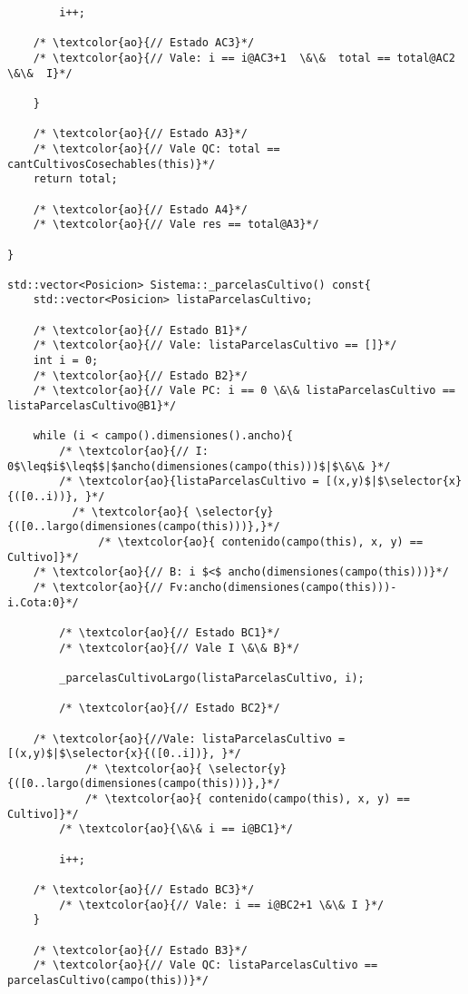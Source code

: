\begin{lstlisting}
        i++;
    
    /* \textcolor{ao}{// Estado AC3}*/
    /* \textcolor{ao}{// Vale: i == i@AC3+1  \&\&  total == total@AC2 \&\&  I}*/
            
    }

    /* \textcolor{ao}{// Estado A3}*/	    
    /* \textcolor{ao}{// Vale QC: total == cantCultivosCosechables(this)}*/    
    return total;

    /* \textcolor{ao}{// Estado A4}*/    
    /* \textcolor{ao}{// Vale res == total@A3}*/    
    
}

std::vector<Posicion> Sistema::_parcelasCultivo() const{
    std::vector<Posicion> listaParcelasCultivo;

	/* \textcolor{ao}{// Estado B1}*/	    
    /* \textcolor{ao}{// Vale: listaParcelasCultivo == []}*/    
    int i = 0;
	/* \textcolor{ao}{// Estado B2}*/	    
    /* \textcolor{ao}{// Vale PC: i == 0 \&\& listaParcelasCultivo == listaParcelasCultivo@B1}*/    
        
    while (i < campo().dimensiones().ancho){ 
    	/* \textcolor{ao}{// I: 0$\leq$i$\leq$$|$ancho(dimensiones(campo(this)))$|$\&\& }*/
    	/* \textcolor{ao}{listaParcelasCultivo = [(x,y)$|$\selector{x}{([0..i))}, }*/		
  		  /* \textcolor{ao}{ \selector{y}{([0..largo(dimensiones(campo(this)))},}*/		
    		  /* \textcolor{ao}{ contenido(campo(this), x, y) == Cultivo]}*/
	/* \textcolor{ao}{// B: i $<$ ancho(dimensiones(campo(this)))}*/
	/* \textcolor{ao}{// Fv:ancho(dimensiones(campo(this)))-i.Cota:0}*/
    
    	/* \textcolor{ao}{// Estado BC1}*/   
    	/* \textcolor{ao}{// Vale I \&\& B}*/       	    
        
        _parcelasCultivoLargo(listaParcelasCultivo, i);

    	/* \textcolor{ao}{// Estado BC2}*/   
    	
    /* \textcolor{ao}{//Vale: listaParcelasCultivo = [(x,y)$|$\selector{x}{([0..i])}, }*/		
    		/* \textcolor{ao}{ \selector{y}{([0..largo(dimensiones(campo(this)))},}*/		
    		/* \textcolor{ao}{ contenido(campo(this), x, y) == Cultivo]}*/    	
    	/* \textcolor{ao}{\&\& i == i@BC1}*/

        i++;
        
	/* \textcolor{ao}{// Estado BC3}*/   
    	/* \textcolor{ao}{// Vale: i == i@BC2+1 \&\& I }*/        
    }
    
    /* \textcolor{ao}{// Estado B3}*/	    
    /* \textcolor{ao}{// Vale QC: listaParcelasCultivo == parcelasCultivo(campo(this))}*/    
    

\end{lstlisting}

